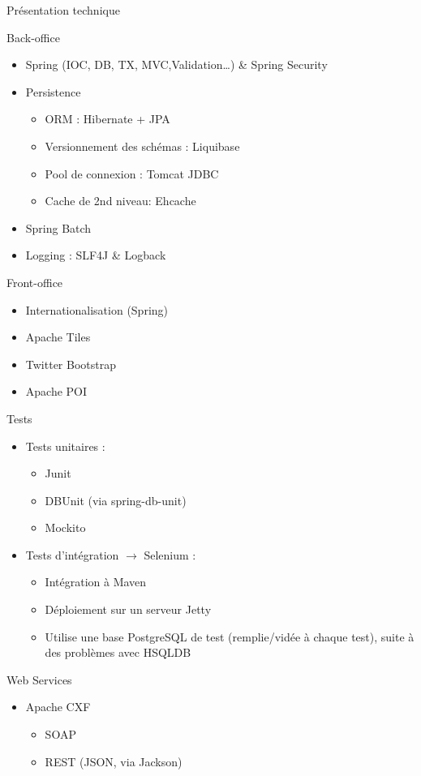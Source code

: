 \begin{frame}
	\begin{center}
		 \huge{Pr\'esentation technique}
	\end{center}
\end{frame}

\begin{frame}{Back-office}
	\begin{itemize}
		\item Spring (IOC, DB, TX, MVC,Validation\ldots) \& Spring Security
		\item Persistence
		\begin{itemize}
			\item ORM : Hibernate + JPA 
			\item Versionnement des sch\'emas : Liquibase
			\item Pool de connexion : Tomcat JDBC			
			\item Cache de 2nd niveau: Ehcache
		\end{itemize}
		\item Spring Batch
		\item Logging : SLF4J \& Logback
	\end{itemize}
\end{frame}

\begin{frame}{Front-office}	
	\begin{itemize}
		\item Internationalisation (Spring)
		\item Apache Tiles
		\item Twitter Bootstrap
		\item Apache POI
	\end{itemize}
\end{frame}

\begin{frame}{Tests}
	\begin{itemize}
		\item Tests unitaires : 
			\begin{itemize}
				\item Junit
				\item DBUnit (via spring-db-unit)
				\item Mockito
			\end{itemize}
		\item Tests d'int\'egration $\rightarrow$ Selenium :
			\begin{itemize}
				\item Int\'egration \`a Maven
				\item D\'eploiement sur un serveur Jetty
				\item Utilise une base PostgreSQL de test (remplie/vid\'ee \`a chaque test), suite \`a des probl\`emes avec HSQLDB
			\end{itemize}
	\end{itemize}
\end{frame}

\begin{frame}{Web Services}
	\begin{itemize}
		\item Apache CXF
		\begin{itemize}
			\item SOAP
			\item REST (JSON, via Jackson)
		\end{itemize}
	\end{itemize}
\end{frame}
